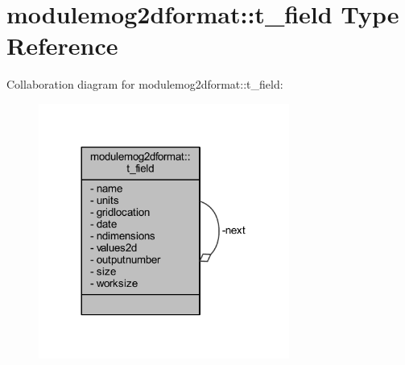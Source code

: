 \hypertarget{structmodulemog2dformat_1_1t__field}{}\section{modulemog2dformat\+:\+:t\+\_\+field Type Reference}
\label{structmodulemog2dformat_1_1t__field}


Collaboration diagram for modulemog2dformat\+:\+:t\+\_\+field\+:\nopagebreak
\begin{figure}[H]
\begin{center}
\leavevmode
\includegraphics[width=233pt]{structmodulemog2dformat_1_1t__field__coll__graph}
\end{center}
\end{figure}
